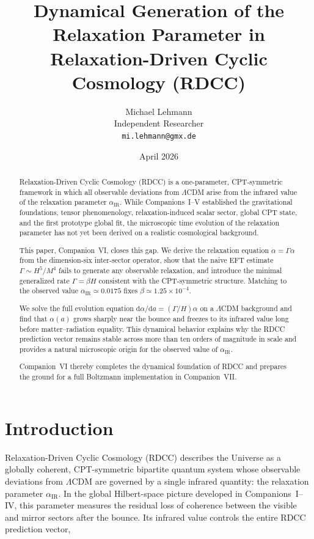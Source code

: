 \documentclass[11pt,a4paper]{article}
\title{\textbf{Dynamical Generation of the Relaxation Parameter in\\
Relaxation-Driven Cyclic Cosmology (RDCC)}}
\author{Michael Lehmann\\
Independent Researcher\\
\texttt{mi.lehmann@gmx.de}}
\date{April 2026}
\begin{document}
\maketitle

\begin{abstract}
Relaxation-Driven Cyclic Cosmology (RDCC) is a one-parameter, CPT-symmetric
framework in which all observable deviations from $\Lambda$CDM arise from the
infrared value of the relaxation parameter $\alpha_{\mathrm{IR}}$. While Companions~I--V
established the gravitational foundations, tensor phenomenology, relaxation-induced
scalar sector, global CPT state, and the first prototype global fit, the microscopic
time evolution of the relaxation parameter has not yet been derived on a realistic
cosmological background.

This paper, Companion~VI, closes this gap. We derive the relaxation equation
$\dot{\alpha} = \Gamma \alpha$ from the dimension-six inter-sector operator, show that the
naive EFT estimate $\Gamma \sim H^5/M^4$ fails to generate any observable relaxation,
and introduce the minimal generalized rate $\Gamma = \beta H$ consistent with the
CPT-symmetric structure. Matching to the observed value $\alpha_{\mathrm{IR}} \simeq 0.0175$
fixes $\beta \simeq 1.25 \times 10^{-4}$.

We solve the full evolution equation $\mathrm{d}\alpha/\mathrm{d}a = (\Gamma/H)\alpha$ on a
$\Lambda$CDM background and find that $\alpha(a)$ grows sharply near the bounce and
freezes to its infrared value long before matter–radiation equality. This dynamical
behavior explains why the RDCC prediction vector remains stable across more than ten
orders of magnitude in scale and provides a natural microscopic origin for the observed
value of $\alpha_{\mathrm{IR}}$.

Companion~VI thereby completes the dynamical foundation of RDCC and prepares the
ground for a full Boltzmann implementation in Companion~VII.
\end{abstract}

\newpage

\tableofcontents

\newpage

\section{Introduction}

Relaxation-Driven Cyclic Cosmology (RDCC) describes the Universe as a globally coherent,
CPT-symmetric bipartite quantum system whose observable deviations from $\Lambda$CDM are
governed by a single infrared quantity: the relaxation parameter $\alpha_{\mathrm{IR}}$. In the global
Hilbert-space picture developed in Companions~I–IV, this parameter measures the residual loss
of coherence between the visible and mirror sectors after the bounce. Its infrared value controls
the entire RDCC prediction vector,
\end{document}
